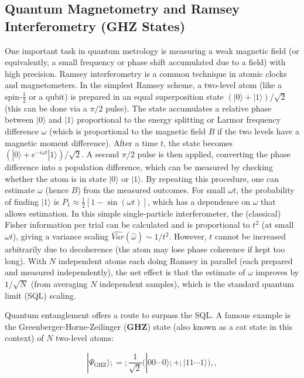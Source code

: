 \subsection{Quantum Magnetometry and Ramsey Interferometry (GHZ States)}

\label{sec:GHZ-Ramsey}



One important task in quantum metrology is measuring a weak magnetic
field (or equivalently, a small frequency or phase shift accumulated
due to a field) with high precision. Ramsey interferometry is a common
technique in atomic clocks and magnetometers. In the simplest Ramsey
scheme, a two-level atom (like a spin-$\frac{1}{2}$ or a qubit) is
prepared in an equal superposition state $(|0\rangle +
|1\rangle)/\sqrt{2}$ (this can be done via a $\pi/2$ pulse). The state
accumulates a relative phase between $|0\rangle$ and $|1\rangle$
proportional to the energy splitting or Larmor frequency difference
$\omega$ (which is proportional to the magnetic field $B$ if the two
levels have a magnetic moment difference). After a time $t$, the state
becomes $(|0\rangle + e^{-i\omega t}|1\rangle)/\sqrt{2}$. A second
$\pi/2$ pulse is then applied, converting the phase difference into a
population difference, which can be measured by checking whether the
atom is in state $|0\rangle$ or $|1\rangle$. By repeating this
procedure, one can estimate $\omega$ (hence $B$) from the measured
outcomes. For small $\omega t$, the probability of finding $|1\rangle$
is $P_1 \approx \frac{1}{2}[1 - \sin(\omega t)]$, which has a
dependence on $\omega$ that allows estimation. In this simple
single-particle interferometer, the (classical) Fisher information per
trial can be calculated and is proportional to $t^2$ (at small $\omega
t$), giving a variance scaling $\widehat{Var}(\hat{\omega}) \sim
1/t^2$. However, $t$ cannot be increased arbitrarily due to
decoherence (the atom may lose phase coherence if kept too long). With
$N$ independent atoms each doing Ramsey in parallel (each prepared and
measured independently), the net effect is that the estimate of
$\omega$ improves by $1/\sqrt{N}$ (from averaging $N$ independent
samples), which is the standard quantum limit (SQL) scaling.



Quantum entanglement offers a route to surpass the SQL. A famous
example is the Greenberger-Horne-Zeilinger (\textbf{GHZ}) state (also
known as a cat state in this context) of $N$ two-level atoms:

\begin{equation}
|\Psi_{\text{GHZ}}\rangle ;=; \frac{1}{\sqrt{2}}\Big(|0 0 \cdots 0\rangle ;+; |1 1 \cdots 1\rangle\Big) ,,
\label{eq:GHZ-state}
\end{equation}

